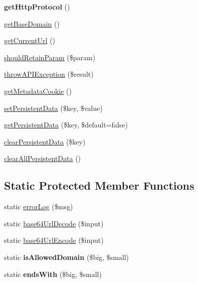 \begin{DoxyCompactItemize}
\item 
\hypertarget{classBaseFacebook_af9abc533c861a43f273e78060460a277}{{\bfseries get\-Http\-Protocol} ()}\label{classBaseFacebook_af9abc533c861a43f273e78060460a277}

\item 
\hyperlink{classBaseFacebook_a63cedad2b05bd6b120c1f6e58b87952a}{get\-Base\-Domain} ()
\item 
\hyperlink{classBaseFacebook_a5746a277eddefc701ad5308285252465}{get\-Current\-Url} ()
\item 
\hyperlink{classBaseFacebook_a47e7827a14b19657e2a760afa5324dad}{should\-Retain\-Param} (\$param)
\item 
\hyperlink{classBaseFacebook_a83875df5a95a05bbbb4857460e743404}{throw\-A\-P\-I\-Exception} (\$result)
\item 
\hyperlink{classBaseFacebook_a934183edea46236610bc661c92747c71}{get\-Metadata\-Cookie} ()
\item 
\hyperlink{classBaseFacebook_a26198ff065bea23f358854facbafa7db}{set\-Persistent\-Data} (\$key, \$value)
\item 
\hyperlink{classBaseFacebook_ad383ccec6f7433c2ab9bb50550df2ce6}{get\-Persistent\-Data} (\$key, \$default=false)
\item 
\hyperlink{classBaseFacebook_a3bfb6ef7b1abbd3ec0545be109d32bef}{clear\-Persistent\-Data} (\$key)
\item 
\hyperlink{classBaseFacebook_a2f98dbe9b9b63d3e76ba7f1971d80c91}{clear\-All\-Persistent\-Data} ()
\end{DoxyCompactItemize}
\subsection*{Static Protected Member Functions}
\begin{DoxyCompactItemize}
\item 
static \hyperlink{classBaseFacebook_a8f2b4289828f4f1e758c05f483eca682}{error\-Log} (\$msg)
\item 
static \hyperlink{classBaseFacebook_a8cb499f186fbbd10b7d30c37094d9b97}{base64\-Url\-Decode} (\$input)
\item 
static \hyperlink{classBaseFacebook_aa9a23342190c5b2dedfbab5354de6d8b}{base64\-Url\-Encode} (\$input)
\item 
\hypertarget{classBaseFacebook_af9bbbb9875829d9f0dcbc9eff6524f43}{static {\bfseries is\-Allowed\-Domain} (\$big, \$small)}\label{classBaseFacebook_af9bbbb9875829d9f0dcbc9eff6524f43}

\item 
\hypertarget{classBaseFacebook_a3d654f35a132f19cba844cb276bb09f3}{static {\bfseries ends\-With} (\$big, \$small)}\label{classBaseFacebook_a3d654f35a132f19cba844cb276bb09f3}

\end{DoxyCompactItemize}
